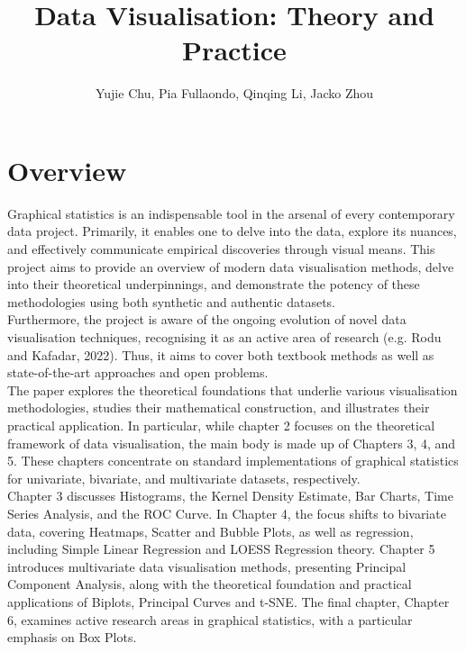 \documentclass{article}\usepackage[]{graphicx}\usepackage[]{xcolor}
\title{Data Visualisation: Theory and Practice}
\author{Yujie Chu, Pia Fullaondo, Qinqing Li, Jacko Zhou}
\numberwithin{equation}{section}
\begin{document}
\maketitle 

\newpage
\tableofcontents

\newpage  %

\section*{Overview}


\noindent
Graphical statistics is an indispensable tool in the arsenal of every contemporary data project. Primarily, it enables one to delve into the data, explore its nuances, and effectively communicate empirical discoveries through visual means. This project aims to provide an overview of modern data visualisation methods, delve into their theoretical underpinnings, and demonstrate the potency of these methodologies using both synthetic and authentic datasets.\\

\noindent 
Furthermore, the project is aware of the ongoing evolution of novel data visualisation techniques, recognising it as an active area of research (e.g. Rodu and Kafadar, 2022). Thus, it aims to cover both textbook methods as well as state-of-the-art approaches and open problems.\\

\noindent
The paper explores the theoretical foundations that underlie various visualisation methodologies, studies their mathematical construction, and illustrates their practical application. In particular, while chapter 2 focuses on the theoretical framework of data visualisation, the main body is made up of Chapters 3, 4, and 5. These chapters concentrate on standard implementations of graphical statistics for univariate, bivariate, and multivariate datasets, respectively.\\

\noindent 
Chapter 3 discusses Histograms, the Kernel Density Estimate, Bar Charts, Time Series Analysis, and the ROC Curve. In Chapter 4, the focus shifts to bivariate data, covering Heatmaps, Scatter and Bubble Plots, as well as regression, including Simple Linear Regression and LOESS Regression theory. Chapter 5 introduces multivariate data visualisation methods, presenting Principal Component Analysis, along with the theoretical foundation and practical applications of Biplots, Principal Curves and t-SNE. The final chapter, Chapter 6, examines active research areas in graphical statistics, with a particular emphasis on Box Plots.\\
\end{document}
